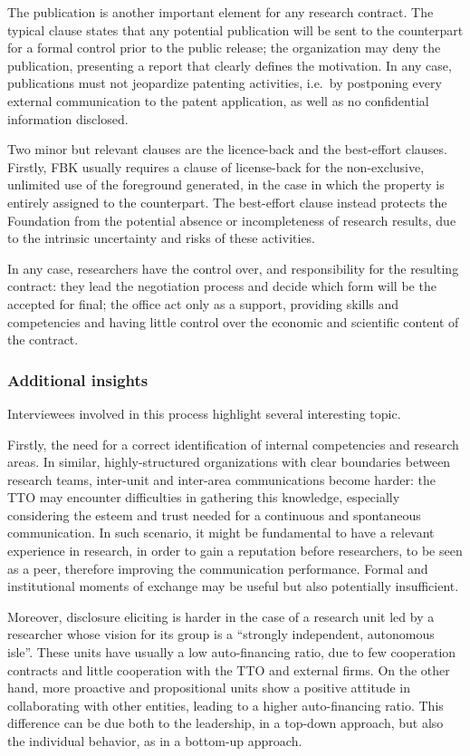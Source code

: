 The publication is another important element for any research contract. The typical clause states that any potential publication will be sent to the counterpart for a formal control prior to the public release; the organization may deny the publication, presenting a report that clearly defines the motivation. In any case, publications must not jeopardize patenting activities, i.e.\ by postponing every external communication to the patent application, as well as no confidential information disclosed.

Two minor but relevant clauses are the licence-back and the best-effort clauses. Firstly, FBK usually requires a clause of license-back for the non-exclusive, unlimited use of the foreground generated, in the case in which the property is entirely assigned to the counterpart. The best-effort clause instead protects the Foundation from the potential absence or incompleteness of research results, due to the intrinsic uncertainty and risks of these activities.

In any case, researchers have the control over, and responsibility for the resulting contract: they lead the negotiation process and decide which form will be the accepted for final; the office act only as a support, providing skills and competencies and having little control over the economic and scientific content of the contract.

\subsubsection{Additional insights}

Interviewees involved in this process highlight several interesting topic.

Firstly, the need for a correct identification of internal competencies and research areas. In similar, highly-structured organizations with clear boundaries between research teams, inter-unit and inter-area communications become harder: the TTO may encounter difficulties in gathering this knowledge, especially considering the esteem and trust needed for a continuous and spontaneous communication. In such scenario, it might be fundamental to have a relevant experience in research, in order to gain a reputation before researchers, to be seen as a peer, therefore improving the communication performance. Formal and institutional moments of exchange may be useful but also potentially insufficient.

Moreover, disclosure eliciting is harder in the case of a research unit led by a researcher whose vision for its group is a \enquote{strongly independent, autonomous isle}. These units have usually a low auto-financing ratio, due to few cooperation contracts and little cooperation with the TTO and external firms. On the other hand, more proactive and propositional units show a positive attitude in collaborating with other entities, leading to a higher auto-financing ratio. This difference can be due both to the leadership, in a top-down approach, but also the individual behavior, as in a bottom-up approach. 

